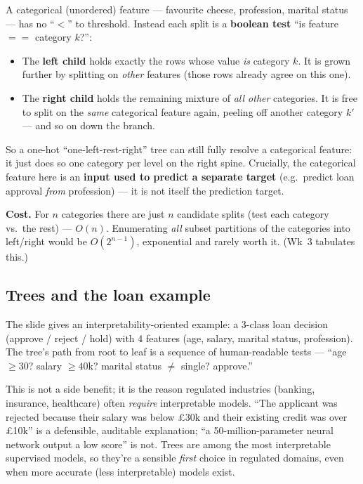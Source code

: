 \documentclass[11pt, a4paper]{article}
\begin{document}
\begin{notebox}
A categorical (unordered) feature — favourite cheese, profession, marital status — has no ``$<$'' to threshold. Instead each split is a \textbf{boolean test} ``is feature $== $ category $k$?'':
\begin{itemize}
  \item The \textbf{left child} holds exactly the rows whose value \emph{is} category $k$. It is grown further by splitting on \emph{other} features (those rows already agree on this one).
  \item The \textbf{right child} holds the remaining mixture of \emph{all other} categories. It is free to split on the \emph{same} categorical feature again, peeling off another category $k'$ — and so on down the branch.
\end{itemize}
So a one-hot ``one-left-rest-right'' tree can still fully resolve a categorical feature: it just does so one category per level on the right spine. Crucially, the categorical feature here is an \textbf{input used to predict a separate target} (e.g.\ predict loan approval \emph{from} profession) — it is not itself the prediction target.

\textbf{Cost.} For $n$ categories there are just $n$ candidate splits (test each category vs.\ the rest) — $O(n)$. Enumerating \emph{all} subset partitions of the categories into left/right would be $O(2^{n-1})$, exponential and rarely worth it. (Wk~3 tabulates this.)
\end{notebox}

\subsection{Trees and the loan example}

The slide gives an interpretability-oriented example: a 3-class loan decision (approve / reject / hold) with 4 features (age, salary, marital status, profession). The tree's path from root to leaf is a sequence of human-readable tests — ``age $\ge 30$? salary $\ge 40$k? marital status $\ne$ single? approve.''

This is not a side benefit; it is the reason regulated industries (banking, insurance, healthcare) often \emph{require} interpretable models. ``The applicant was rejected because their salary was below £30k and their existing credit was over £10k'' is a defensible, auditable explanation; ``a 50-million-parameter neural network output a low score'' is not. Trees are among the most interpretable supervised models, so they're a sensible \emph{first} choice in regulated domains, even when more accurate (less interpretable) models exist.
\end{document}
